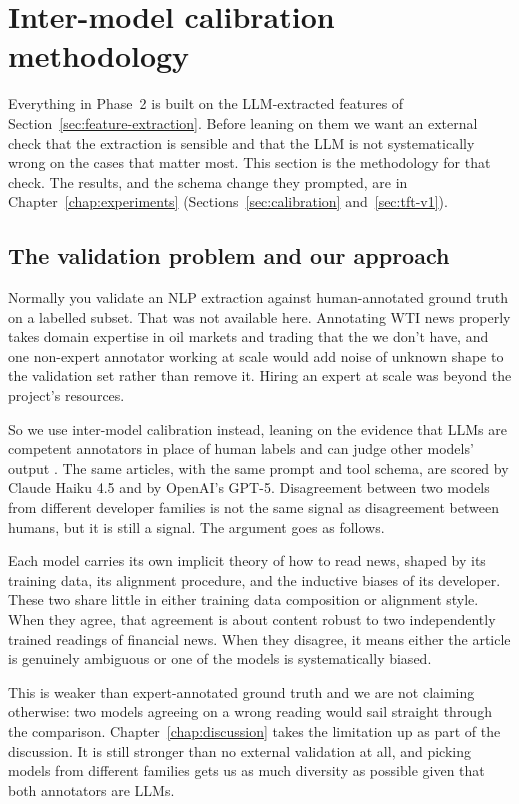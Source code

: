\section{Inter-model calibration methodology}\label{sec:calibration-methods}

Everything in Phase~2 is built on the LLM-extracted features of Section~\ref{sec:feature-extraction}. Before leaning on them we want an external check that the extraction is sensible and that the LLM is not systematically wrong on the cases that matter most. This section is the methodology for that check. The results, and the schema change they prompted, are in Chapter~\ref{chap:experiments} (Sections~\ref{sec:calibration} and~\ref{sec:tft-v1}).

\subsection{The validation problem and our approach}\label{sec:validation-problem}

Normally you validate an NLP extraction against human-annotated ground truth on a labelled subset. That was not available here. Annotating WTI news properly takes domain expertise in oil markets and trading that the we don't have, and one non-expert annotator working at scale would add noise of unknown shape to the validation set rather than remove it. Hiring an expert at scale was beyond the project's resources.

So we use inter-model calibration instead, leaning on the evidence that LLMs are competent annotators in place of human labels \citep{gilardi2023} and can judge other models' output \citep{zheng2023}. The same articles, with the same prompt and tool schema, are scored by Claude Haiku 4.5 and by OpenAI's GPT-5. Disagreement between two models from different developer families is not the same signal as disagreement between humans, but it is still a signal. The argument goes as follows.

Each model carries its own implicit theory of how to read news, shaped by its training data, its alignment procedure, and the inductive biases of its developer. These two share little in either training data composition or alignment style. When they agree, that agreement is about content robust to two independently trained readings of financial news. When they disagree, it means either the article is genuinely ambiguous or one of the models is systematically biased.

This is weaker than expert-annotated ground truth and we are not claiming otherwise: two models agreeing on a wrong reading would sail straight through the comparison. Chapter~\ref{chap:discussion} takes the limitation up as part of the discussion. It is still stronger than no external validation at all, and picking models from different families gets us as much diversity as possible given that both annotators are LLMs.

